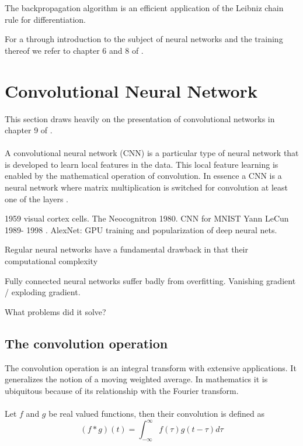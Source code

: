 \documentclass[../../thesis.tex]{subfiles}
\begin{document}
The backpropagation algorithm is an efficient application of the Leibniz chain rule for differentiation.\newline


For a through introduction to the subject of neural networks and the training thereof we refer to chapter 6 and 8 of \cite{deeplearningbook}.


\section{Convolutional Neural Network}
This section draws heavily on the presentation of convolutional networks in chapter 9 of \cite{deeplearningbook}.\\\\

A convolutional neural network (CNN) is a particular type of neural network that is developed to learn local features in the data. This local feature learning is enabled by the mathematical operation of convolution. In essence a CNN is a neural network where matrix multiplication is switched for convolution at least one of the layers \cite{deeplearningbook}. 

1959 visual cortex cells. The Neocognitron 1980. CNN for MNIST Yann LeCun 1989- 1998 \cite{LeCun1989ConvNet}. AlexNet: GPU training and popularization of deep neural nets.

Regular neural networks have a fundamental drawback in that their computational complexity 

Fully connected neural networks suffer badly from overfitting. Vanishing gradient / exploding gradient.

What problems did it solve?

\subsection{The convolution operation}

The convolution operation is an integral transform with extensive applications. It generalizes the notion of a moving weighted average. In mathematics it is ubiquitous because of its relationship with the Fourier transform.
\\\\
Let $f$ and $g$ be real valued functions, then their convolution is defined as
\begin{equation}
    (f*g)(t) = \int_{-\infty}^{\infty} f(\tau)g(t-\tau) d\tau
\end{equation}
\end{document}
